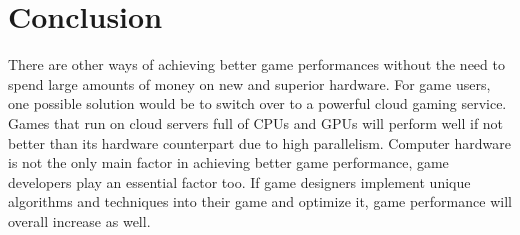 \documentclass{article}
\begin{document}
\section{Conclusion}
There are other ways of achieving better game performances without the need to spend large amounts of money on new and superior hardware. For game users, one possible solution would be to switch over to a powerful cloud gaming service. Games that run on cloud servers full of CPUs and GPUs will perform well if not better than its hardware counterpart due to high parallelism. Computer hardware is not the only main factor in achieving better game performance, game developers play an essential factor too. If game designers implement unique algorithms and techniques into their game and optimize it, game performance will overall increase as well. 



\end{document}
